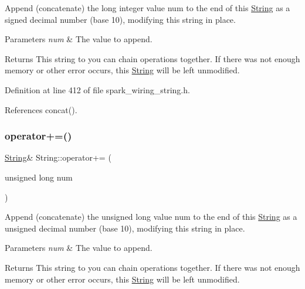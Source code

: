 Append (concatenate) the long integer value num to the end of this \hyperlink{class_string}{String} as a signed decimal number (base 10), modifying this string in place. 


\begin{DoxyParams}{Parameters}
{\em num} & The value to append.\\
\hline
\end{DoxyParams}
\begin{DoxyReturn}{Returns}
This string to you can chain operations together. If there was not enough memory or other error occurs, this \hyperlink{class_string}{String} will be left unmodified. 
\end{DoxyReturn}


Definition at line 412 of file spark\+\_\+wiring\+\_\+string.\+h.



References concat().

\mbox{\label{class_string_aeaf915e3c8fa71652b2fae59f201a5a2}} 
\subsubsection{\texorpdfstring{operator+=()}{operator+=()}\hspace{0.1cm}{\footnotesize\ttfamily [8/8]}}
{\footnotesize\ttfamily \hyperlink{class_string}{String}\& String\+::operator+= (\begin{DoxyParamCaption}\item[{unsigned long}]{num }\end{DoxyParamCaption})\hspace{0.3cm}{\ttfamily [inline]}}



Append (concatenate) the unsigned long value num to the end of this \hyperlink{class_string}{String} as a unsigned decimal number (base 10), modifying this string in place. 


\begin{DoxyParams}{Parameters}
{\em num} & The value to append.\\
\hline
\end{DoxyParams}
\begin{DoxyReturn}{Returns}
This string to you can chain operations together. If there was not enough memory or other error occurs, this \hyperlink{class_string}{String} will be left unmodified. 
\end{DoxyReturn}


